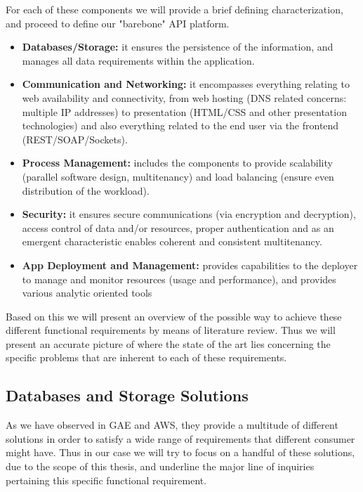 \documentclass[11pt]{amsart}
\begin{document}
\begin{enumarate}
\begin{center}
          \end{center}
          For each of these components we will provide a brief defining characterization,
          and proceed to define our "barebone" API platform.
          \begin{itemize}
            \item \textbf{Databases/Storage:} it ensures the persistence of the
              information, and manages all data requirements within the application.
            \item \textbf{Communication and Networking:} it encompasses everything
              relating to web availability and connectivity, from web hosting (DNS related
              concerns: multiple IP addresses) to presentation (HTML/CSS and other
              presentation technologies) and also everything related to the end user via
              the frontend (REST/SOAP/Sockets).
            \item \textbf{Process Management:} includes the
              components to provide scalability (parallel software design, multitenancy) and
              load balancing (ensure even distribution of the workload).
            \item \textbf{Security:} it ensures secure communications (via encryption and
              decryption), access control of data and/or resources, proper authentication
              and as an emergent characteristic enables coherent and consistent
              multitenancy. 
            \item \textbf{App Deployment and Management:} provides capabilities to the
              deployer to manage and monitor resources (usage and performance), and
              provides various analytic oriented tools 
          \end{itemize}
          Based on this we will present an overview of the possible way to achieve these
          different functional requirements by means of literature review. Thus we will
          present an accurate picture of where the state of the art lies concerning the
          specific problems that are inherent to each of these requirements.
         
          \subsection{Databases and Storage Solutions}
          As we have observed in GAE and AWS, they provide a multitude of different
          solutions in order to satisfy a wide range of requirements that different
          consumer might have. Thus in our case we will try to focus on a handful of these
          solutions, due to the scope of this thesis, and underline the major line of
          inquiries pertaining this specific functional requirement.


\end{enumarate}
\end{document}
